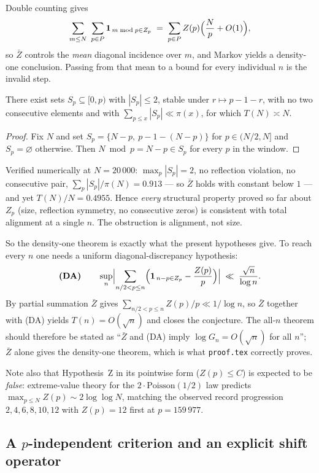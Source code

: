 Double counting gives
\[
  \sum_{m\le N}\ \sum_{p\in P}\mathbf 1_{\,m\bmod p\in Z_p}
  \;=\;\sum_{p\in P}Z(p)\Bigl(\frac Np+O(1)\Bigr),
\]
so $\bar Z$ controls the \emph{mean} diagonal incidence over $m$, and Markov yields a
density-one conclusion.  Passing from that mean to a bound for every individual $n$ is the
invalid step.

\begin{proposition}
There exist sets $S_p\subseteq[0,p)$ with $|S_p|\le2$, stable under $r\mapsto p-1-r$, with no
two consecutive elements and with $\sum_{p\le x}|S_p|\ll\pi(x)$, for which
$T(N)\asymp N$.
\end{proposition}

\begin{proof}
Fix $N$ and set $S_p=\{N-p,\ p-1-(N-p)\}$ for $p\in(N/2,N]$ and $S_p=\varnothing$ otherwise.
Then $N\bmod p=N-p\in S_p$ for every $p$ in the window.
\end{proof}

Verified numerically at $N=20\,000$: $\max_p|S_p|=2$, no reflection violation, no consecutive
pair, $\sum_p|S_p|/\pi(N)=0.913$ — so $\bar Z$ holds with constant below $1$ — and yet
$T(N)/N=0.4955$.  Hence \emph{every} structural property proved so far about $Z_p$
(size, reflection symmetry, no consecutive zeros) is consistent with total alignment at a
single $n$.  The obstruction is alignment, not size.

So the density-one theorem is exactly what the present hypotheses give.  To reach every $n$
one needs a uniform diagonal-discrepancy hypothesis:
\[
  \textbf{(DA)}\qquad
  \sup_n\Bigl|\sum_{n/2<p\le n}
   \Bigl(\mathbf 1_{\,n-p\in Z_p}-\frac{Z(p)}p\Bigr)\Bigr|
  \;\ll\;\frac{\sqrt n}{\log n}.
\]
By partial summation $\bar Z$ gives $\sum_{n/2<p\le n}Z(p)/p\ll1/\log n$, so
$\bar Z$ together with (DA) yields $T(n)=O(\sqrt n)$ and closes the conjecture.  The all-$n$ theorem should therefore be stated as ``$\bar Z$ and (DA) imply
$\log G_n=O(\sqrt n)$ for all $n$''; $\bar Z$ alone gives the density-one theorem, which is
what \texttt{proof.tex} correctly proves.

Note also that Hypothesis~Z in its pointwise form ($Z(p)\le C$) is expected to be
\emph{false}: extreme-value theory for the $2\cdot\mathrm{Poisson}(1/2)$ law predicts
$\max_{p\le N}Z(p)\sim2\log\log N$, matching the observed record progression
$2,4,6,8,10,12$ with $Z(p)=12$ first at $p=159\,977$.

\subsection{A $p$-independent criterion and an explicit shift operator}
\label{subsec:shift}

